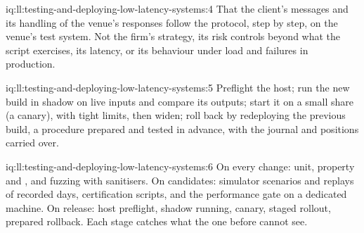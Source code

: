 \begin{solution}{iq:ll:testing-and-deploying-low-latency-systems:4}
That the client's messages and its handling of the venue's responses follow the protocol, step by step, on the venue's test
system. Not the firm's strategy, its risk controls beyond what the script exercises, its latency, or its behaviour under load
and failures in production.
\end{solution}

\begin{solution}{iq:ll:testing-and-deploying-low-latency-systems:5}
Preflight the host; run the new build in shadow on live inputs and compare its outputs; start it on a small share (a canary),
with tight limits, then widen; roll back by redeploying the previous build, a procedure prepared and tested in advance, with the
journal and positions carried over.
\end{solution}

\begin{solution}{iq:ll:testing-and-deploying-low-latency-systems:6}
On every change: unit, property and , and fuzzing with sanitisers. On candidates: simulator scenarios and
replays of recorded days, certification scripts, and the performance gate on a dedicated machine. On release: host preflight,
shadow running, canary, staged rollout, prepared rollback. Each stage catches what the one before cannot see.
\end{solution}
